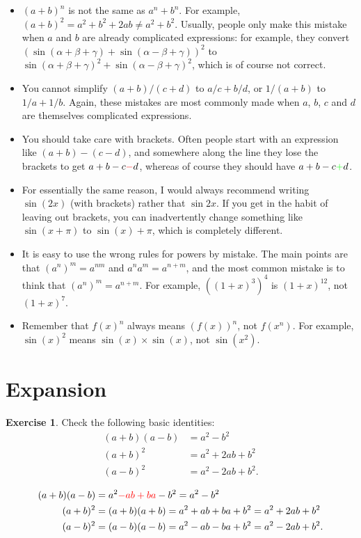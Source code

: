 \documentclass[a4paper]{book}
\newcommand{\RED}[1]{{\color{red}#1}}
\newcommand{\GREEN}[1]{{\color{green}#1}}
\newcommand{\tm}        {\times}
\newcommand{\al}        {\alpha}
\newcommand{\bt}        {\beta}
\newcommand{\gm}        {\gamma}
\renewcommand{\:}{\colon}
\theoremstyle{definition}
\newtheorem{exercise}[theorem]{Exercise}
\renewenvironment{solution}{\SolutionInline}{\endSolutionInline}
\begin{document}
\begin{itemize}
 \item $(a+b)^n$ is not the same as $a^n+b^n$.  For example,
  $(a+b)^2=a^2+b^2+2ab\neq a^2+b^2$.  Usually, people only make this
  mistake when $a$ and $b$ are already complicated expressions: for
  example, they convert $(\sin(\al+\bt+\gm)+\sin(\al-\bt+\gm))^2$ to
  $\sin(\al+\bt+\gm)^2+\sin(\al-\bt+\gm)^2$, which is of course not
  correct.
 \item You cannot simplify $(a+b)/(c+d)$ to $a/c+b/d$, or $1/(a+b)$ to
  $1/a+1/b$.  Again, these mistakes are most commonly made when $a$,
  $b$, $c$ and $d$ are themselves complicated expressions.
 \item You should take care with brackets.  Often people start with an
  expression like $(a+b)-(c-d)$, and somewhere along the line they
  lose the brackets to get $a+b-c\RED{-}d$, whereas of course they
  should have $a+b-c\GREEN{+}d$.
 \item For essentially the same reason, I would always recommend
  writing $\sin(2x)$ (with brackets) rather that $\sin 2x$.  If you
  get in the habit of leaving out brackets, you can inadvertently
  change something like $\sin(x+\pi)$ to $\sin(x)+\pi$, which is
  completely different.
 \item It is easy to use the wrong rules for powers by mistake.  The
  main points are that $(a^n)^m=a^{nm}$ and $a^na^m=a^{n+m}$, and the
  most common mistake is to think that $(a^n)^m=a^{n+m}$.  For
  example, $((1+x)^3)^4$ is $(1+x)^{12}$, not $(1+x)^7$.
 \item Remember that $f(x)^n$ always means $(f(x))^n$, not $f(x^n)$.
  For example, $\sin(x)^2$ means $\sin(x)\tm\sin(x)$, not
  $\sin(x^2)$. 
\end{itemize}

\section{Expansion}
\label{sec-expand}

\begin{exercise}
 Check the following basic identities:
 \begin{align*}
  (a+b)(a-b) &= a^2 - b^2 \\
  (a+b)^2    &= a^2 + 2ab + b^2 \\
  (a-b)^2    &= a^2 - 2ab + b^2.
 \end{align*}
\end{exercise}
\begin{solution}
 \begin{align*}
  (a+b)(a-b) &= a^2 \RED{ - ab + ba} - b^2 = a^2 - b^2 \\
  (a+b)^2 &= (a+b)(a+b) = a^2 + ab + ba + b^2 = a^2 + 2ab + b^2 \\
  (a-b)^2 &= (a-b)(a-b) = a^2 - ab - ba + b^2 = a^2 - 2ab + b^2.
 \end{align*}
\end{solution}
\end{document}
